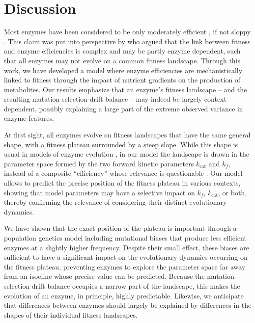 \documentclass[nogrid,crop,final]{MBE2}%
\begin{document}
\section{Discussion\label{sec:Discussion}}

Most enzymes have been considered to be only moderately efficient \citep{Bar-Even11}, if not sloppy \citep{Bar-Even15}. This claim was put into perspective by \citet{Newton18} who argued that the link between fitness and enzyme efficiencies is complex and may be partly enzyme dependent, such that all enzymes may not evolve on a common fitness landscape. Through this work, we have developed a model where enzyme efficiencies are mechanistically linked to fitness through the impact of nutrient gradients on the production of metabolites. Our results emphasize that an enzyme's fitness landscape -- and the resulting mutation-selection-drift balance -- may indeed be largely context dependent, possibly explaining a large part of the extreme observed variance in enzyme features.

At first sight, all enzymes evolve on fitness landscapes that have the same general shape, with a fitness plateau surrounded by a steep slope. While this shape is usual in models of enzyme evolution \citep{Hartl85,Kaltenbach14,Yi19}, in our model the landscape is drawn in the parameter space formed by the two forward kinetic parameters $k_\text{cat}$ and $k_f$, instead of a composite ``efficiency'' whose relevance is questionable \citep{Eisenthal07,Koshland02}. Our model allows to predict the precise position of the fitness plateau in various contexts, showing that model parameters may have a selective impact on $k_f$, $k_\text{cat}$, or both, thereby confirming the relevance of considering their distinct evolutionary dynamics. 

We have shown that the exact position of the plateau is important through a population genetics model including mutational biases that produce less efficient enzymes at a slightly higher frequency. Despite their small effect, these biases are sufficient to have a significant impact on the evolutionary dynamics occurring on the fitness plateau, preventing enzymes to explore the parameter space far away from an isocline whose precise value can be predicted. Because the mutation-selection-drift balance occupies a narrow part of the landscape, this makes the evolution of an enzyme, in principle, highly predictable. Likewise, we anticipate that differences between enzymes should largely be explained by differences in the shapes of their individual fitness landscapes. 
\end{document}
